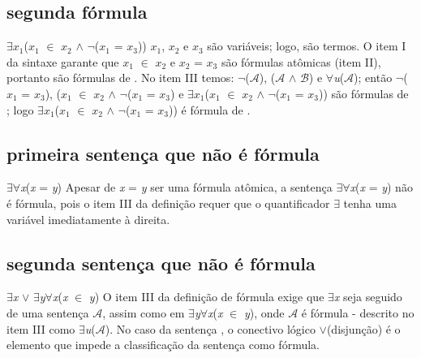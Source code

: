 \subsection{segunda fórmula}
$\exists$\textit{$x_1$}(\textit{$x_1$} $\in$ \textit{$x_2$} $\land$ $\lnot$(\textit{$x_1$} = \textit{$x_3$}))
\newline
\textit{$x_1$}, \textit{$x_2$} e \textit{$x_3$} são variáveis; logo, são termos. O item I da sintaxe  garante que \textit{$x_1$} $\in$ \textit{$x_2$} e \textit{$x_2$} = \textit{$x_3$} são fórmulas atômicas (item II), portanto são fórmulas de . No item III temos: $\lnot$($\mathcal{A}$), ($\mathcal{A}$ $\land$ $\mathcal{B}$) e $\forall$\textit{u}($\mathcal{A}$); então $\lnot$(\textit{$x_1$} = \textit{$x_3$}), (\textit{$x_1$} $\in$ \textit{$x_2$} $\land$ $\lnot$(\textit{$x_1$} = \textit{$x_3$}) e $\exists$\textit{$x_1$}(\textit{$x_1$} $\in$ \textit{$x_2$} $\land$ $\lnot$(\textit{$x_1$} = \textit{$x_3$})) são fórmulas de ; logo \newline$\exists$\textit{$x_1$}(\textit{$x_1$} $\in$ \textit{$x_2$} $\land$ $\lnot$(\textit{$x_1$} = \textit{$x_3$})) é fórmula de .

\subsection{primeira sentença que não é fórmula}
$\exists$$\forall$\textit{x}(\textit{x} = \textit{y})
\newline
Apesar de \textit{x} = \textit{y} ser uma fórmula atômica, a sentença $\exists$$\forall$\textit{x}(\textit{x} = \textit{y}) não é fórmula, pois o item III da definição requer que o quantificador $\exists$ tenha uma variável imediatamente à direita.

\subsection{segunda sentença que não é fórmula}
$\exists$\textit{x} $\lor$ $\exists$\textit{y}$\forall$\textit{x}(\textit{x} $\in$ \textit{y})
\newline
O item III da definição de fórmula exige que $\exists$\textit{x} seja seguido de uma sentença $\mathcal{A}$, assim como em $\exists$\textit{y}$\forall$\textit{x}(\textit{x} $\in$ \textit{y}), onde $\mathcal{A}$ é fórmula - descrito no item III como $\exists$\textit{u}($\mathcal{A}$). No caso da sentença , o conectivo lógico $\lor$(disjunção) é o elemento que impede a classificação da sentença como fórmula.
